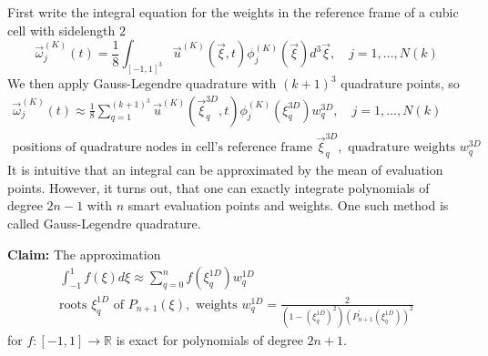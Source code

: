 First write the integral equation for the weights in the reference frame of a cubic cell with sidelength $2$
\begin{equation}
    \vec{\omega}_j^{(K)}(t)=\frac{1}{8} \int_{[-1,1]^3} \vec{u}^{(K)}(\vec{\xi}, t) \phi_j^{(K)}(\vec{\xi}) d^3 \vec{\xi}, \quad j=1, \ldots, N(k)
\end{equation}
We then apply Gauss-Legendre quadrature with $(k+1)^3$ quadrature points, so
\begin{equation}
    \label{eq:dg_weights}
    \begin{gathered}
        \vec{\omega}_j^{(K)}(t) \approx \frac{1}{8} \sum_{q=1}^{(k+1)^3} \vec{u}^{(K)}\left(\vec{\xi}_q^{3 D}, t\right) \phi_j^{(K)}\left(\xi_q^{3 D}\right) w_q^{3 D}, \quad j=1, \ldots, N(k) \\
        \text{positions of quadrature nodes in cell's reference frame } \vec{\xi}_q^{3 D}, \text{ quadrature weights } w_q^{3 D}
    \end{gathered}
\end{equation}
It is intuitive that an integral can be approximated by the mean of evaluation points.
However, it turns out, that one can exactly integrate polynomials of degree $2n-1$ with $n$ smart
evaluation points and weights. One such method is called Gauss-Legendre quadrature.

\textbf{Claim: } The approximation
\begin{equation}
    \begin{gathered}
        \int_{-1}^1 f(\xi) d \xi \approx \sum_{q=0}^n f\left(\xi_q^{1 D}\right) w_q^{1 D} \\
        \text{roots } \xi_q^{1 D} \text{ of } P_{n+1}(\xi), \text{ weights } w_q^{1 D}=\frac{2}{\left(1-\left( \xi_{q}^{1 D} \right)^2\right)\left(P_{n+1}^{\prime}\left(\xi_{q}^{1 D}\right)\right)^{2}}
    \end{gathered}
\end{equation}
for $f: [-1,1] \rightarrow \mathbb{R}$ is exact for polynomials of degree $2n+1$.

